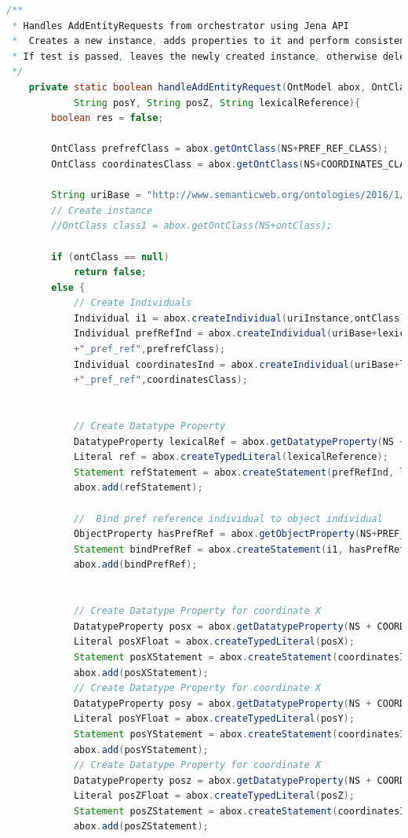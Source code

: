 \begin{lstlisting}[language=Java]
/**
 * Handles AddEntityRequests from orchestrator using Jena API
 *	Creates a new instance, adds properties to it and perform consistency check
 * If test is passed, leaves the newly created instance, otherwise deletes it
 */
	private static boolean handleAddEntityRequest(OntModel abox, OntClass ontClass, String uriInstance, String posX,
			String posY, String posZ, String lexicalReference){
		boolean res = false;

	    OntClass prefrefClass = abox.getOntClass(NS+PREF_REF_CLASS);
	    OntClass coordinatesClass = abox.getOntClass(NS+COORDINATES_CLASS);

		String uriBase = "http://www.semanticweb.org/ontologies/2016/1/semantic_mapping_1#";
		// Create instance
	    //OntClass class1 = abox.getOntClass(NS+ontClass);
		
		if (ontClass == null)
			return false;
		else {
			// Create Individuals
			Individual i1 = abox.createIndividual(uriInstance,ontClass);
		    Individual prefRefInd = abox.createIndividual(uriBase+lexicalReference
		    +"_pref_ref",prefrefClass);
		    Individual coordinatesInd = abox.createIndividual(uriBase+lexicalReference
		    +"_pref_ref",coordinatesClass);
			
			
		    // Create Datatype Property
		    DatatypeProperty lexicalRef = abox.getDatatypeProperty(NS + LEXICAL);
			Literal ref = abox.createTypedLiteral(lexicalReference);
			Statement refStatement = abox.createStatement(prefRefInd, lexicalRef, ref);
			abox.add(refStatement);
			
			//  Bind pref reference individual to object individual
			ObjectProperty hasPrefRef = abox.getObjectProperty(NS+PREF_REF);
			Statement bindPrefRef = abox.createStatement(i1, hasPrefRef, prefRefInd);
			abox.add(bindPrefRef);
			

		    // Create Datatype Property for coordinate X
		    DatatypeProperty posx = abox.getDatatypeProperty(NS + COORD_X);
			Literal posXFloat = abox.createTypedLiteral(posX);
			Statement posXStatement = abox.createStatement(coordinatesInd, posx, posXFloat);
			abox.add(posXStatement);
		    // Create Datatype Property for coordinate X
		    DatatypeProperty posy = abox.getDatatypeProperty(NS + COORD_Y);
			Literal posYFloat = abox.createTypedLiteral(posY);
			Statement posYStatement = abox.createStatement(coordinatesInd, posy, posYFloat);
			abox.add(posYStatement);
		    // Create Datatype Property for coordinate X
		    DatatypeProperty posz = abox.getDatatypeProperty(NS + COORD_Z);
			Literal posZFloat = abox.createTypedLiteral(posZ);
			Statement posZStatement = abox.createStatement(coordinatesInd, posz, posZFloat);
			abox.add(posZStatement);
			


\end{lstlisting}
